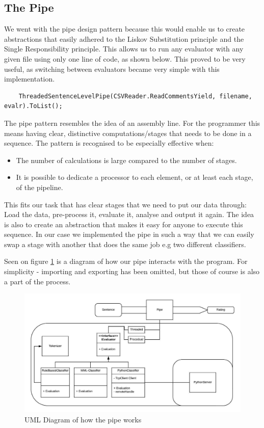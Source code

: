 \subsection{The Pipe}

We went with the pipe design pattern because this would enable us to create abstractions that easily adhered to the Liskov Substitution principle and the Single Responsibility principle. This allows us to run any evaluator with any given file using only one line of code, as shown below. This proved to be very useful, as switching between evaluators became very simple with this implementation. 
\begin{verbatim}
	ThreadedSentenceLevelPipe(CSVReader.ReadCommentsYield, filename, evalr).ToList();
\end{verbatim}


The pipe pattern resembles the idea of an assembly line. For the programmer this means having clear, distinctive computations/stages that needs to be done in a sequence. The pattern is recognised to be especially effective when: \cite{pipeline}
\begin{itemize}
	\item The number of calculations is large compared to the number of stages. 
	\item It is possible to dedicate a processor to each element, or at least each stage, of the pipeline.
\end{itemize}
This fits our task that has clear stages that we need to put our data through: Load the data, pre-process it, evaluate it, analyse and output it again. The idea is also to create an abstraction that makes it easy for anyone to execute this sequence. In our case we implemented the pipe in such a way that we can easily swap a stage with another that does the same job e.g two different classifiers. 

Seen on figure \ref{pipe} is a diagram of how our pipe interacts with the program. For simplicity - importing and exporting has been omitted, but those of course is also a part of the process. 

\begin{figure}[H]
	\includegraphics[width=\textwidth]{Images/Pipe}
	\centering
	\caption{UML Diagram of how the pipe works}
	\label{pipe}
\end{figure}


